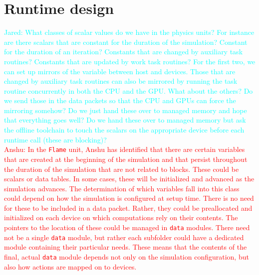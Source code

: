\documentclass{article}
\newcommand{\code}[1]{{\tt#1}}
\newcommand{\Anshu}[1]          {\textcolor{red}{Anshu: #1}}
\newcommand{\Jared}[1]          {\textcolor{cyan}{Jared: #1}}
\newcommand{\taskroutine}        {task routine\xspace}
\newcommand{\taskroutines}       {task routines\xspace}
\begin{document}
\section{Runtime design}
\label{sec:Runtime}

\Jared{What classes of scalar values do we have in the physics units?
For instance are there scalars that are constant for the duration of the
simulation?  Constant for the duration of an iteration?  Constants that are
changed by auxiliary \taskroutines?  Constants that are updated by work \taskroutines?  For the
first two, we can set up mirrors of the variable between host and devices.
Those that are changed by auxiliary \taskroutines can also be mirrored by running the
\taskroutine concurrently in both the CPU and the GPU.  What about the others?  Do we
send those in the data packets so that the CPU and GPUs can force the mirroring
somehow?  Do we just hand these over to managed memory and hope that everything
goes well?  Do we hand these over to managed memory but ask the offline
toolchain to touch the scalars on the appropriate device before each runtime
call (these are blocking)?}\\

\Anshu{In the \code{Flame} unit, Anshu has identified that there are certain
variables that are created at the beginning of the simulation and that persist
throughout the duration of the simulation that are not related to blocks.  These
could be scalars or data tables.  In some cases, these will be initialized and
advanced as the simulation advances.  The determination of which variables fall
into this class could depend on how the simulation is configured at setup
time.  There is no need for these to be included in a data packet.  Rather, they
could be preallocated and initialized on each device on which computations rely
on their contents.  The pointers to the location of these could be managed in
\code{data} modules.  There need not be a single \code{data} module, but rather
each subfolder could have a dedicated module containing their particular needs.
These means that the contents of the final, actual \code{data} module depends
not only on the simulation configuration, but also how actions are mapped on to
devices.}\\
\end{document}
